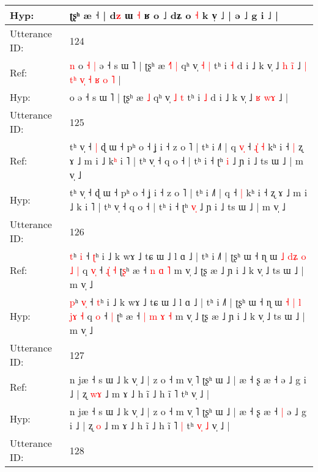 \documentclass[10pt]{article}
\DeclareRobustCommand{\hl}[1]{{\textcolor{red}{#1}}}
\begin{document}
\begin{longtable}{ll}
Hyp: & ʈʂʰ æ ˧\hl{} | d\hl{z} ɯ \hl{˧} ʁ o ˩ dʑ o \hl{˧} k v̩\hl{}\hl{}\hl{}\hl{}\hl{}\hl{} ˩ | ə ˩ g i ˩ |
 \\
\midrule
Utterance ID: & 124 \\
Ref: & \hl{n}\hl{ }o\hl{ }\hl{˧}\hl{ }\hl{|} ə ˧ s ɯ ˥ | ʈʂʰ æ\hl{ }\hl{˧}\hl{˥} \hl{|} qʰ v̩ \hl{˧} \hl{|} tʰ i \hl{˧} d i ˩ k v̩ ˩ \hl{h} \hl{i}\hl{̃} ˩\hl{ }\hl{|}\hl{ }\hl{t}\hl{ʰ}\hl{ }\hl{v}\hl{̩}\hl{ }\hl{˧}\hl{ }\hl{ʁ}\hl{ }\hl{o}\hl{ }\hl{˥} |
 \\
Hyp: & \hl{}\hl{}o\hl{}\hl{}\hl{}\hl{} ə ˧ s ɯ ˥ | ʈʂʰ æ\hl{}\hl{}\hl{} \hl{˩} qʰ v̩ \hl{˩} \hl{t} tʰ i \hl{˩} d i ˩ k v̩ ˩ \hl{ʁ} \hl{w}\hl{ɤ} ˩\hl{}\hl{}\hl{}\hl{}\hl{}\hl{}\hl{}\hl{}\hl{}\hl{}\hl{}\hl{}\hl{}\hl{}\hl{}\hl{} |
 \\
\midrule
Utterance ID: & 125 \\
Ref: & tʰ v̩ ˧\hl{ }\hl{|} ɖ ɯ ˧ pʰ o ˧ ʝ i ˧ z o ˥ | tʰ i ˩˥ | q\hl{ }\hl{v}\hl{̩} ˧\hl{ }\hl{ɻ}\hl{̍} \hl{˧} kʰ i ˧\hl{ }\hl{|} ʐ ɤ ˩ m i ˩ k\hl{ʰ} i ˥ | tʰ v̩ ˧ q o ˧ | tʰ i ˧ ʈʰ \hl{}\hl{i} ˩ ɲ i ˩ ts ɯ ˩ | m v̩ ˩
 \\
Hyp: & tʰ v̩ ˧\hl{}\hl{} ɖ ɯ ˧ pʰ o ˧ ʝ i ˧ z o ˥ | tʰ i ˩˥ | q\hl{}\hl{}\hl{} ˧\hl{}\hl{}\hl{} \hl{|} kʰ i ˧\hl{}\hl{} ʐ ɤ ˩ m i ˩ k\hl{} i ˥ | tʰ v̩ ˧ q o ˧ | tʰ i ˧ ʈʰ \hl{v}\hl{̩} ˩ ɲ i ˩ ts ɯ ˩ | m v̩ ˩
 \\
\midrule
Utterance ID: & 126 \\
Ref: & \hl{t}ʰ \hl{}\hl{i} ˧ \hl{ʈ}ʰ i ˩ k wɤ ˩ tɕ ɯ ˩ l ɑ ˩ | tʰ i ˩˥ | ʈʂʰ ɯ ˧ ɳ ɯ \hl{˩} \hl{d}\hl{ʑ} \hl{o} \hl{}\hl{˩} \hl{|} q \hl{v}\hl{̩} ˧\hl{ }\hl{ɻ}\hl{̍} \hl{˧} ʈ\hl{ʂ}ʰ æ ˧\hl{}\hl{} \hl{n} \hl{ɑ} \hl{˥} m v̩ ˩ ʈʂ æ ˩ ɲ i ˩ k v̩ ˩ ts ɯ ˩ | m v̩ ˩
 \\
Hyp: & \hl{p}ʰ \hl{v}\hl{̩} ˧ \hl{t}ʰ i ˩ k wɤ ˩ tɕ ɯ ˩ l ɑ ˩ | tʰ i ˩˥ | ʈʂʰ ɯ ˧ ɳ ɯ \hl{˧} \hl{}\hl{|} \hl{l} \hl{j}\hl{ɤ} \hl{˧} q \hl{}\hl{o} ˧\hl{}\hl{}\hl{} \hl{|} ʈ\hl{}ʰ æ ˧\hl{ }\hl{|} \hl{m} \hl{ɤ} \hl{˧} m v̩ ˩ ʈʂ æ ˩ ɲ i ˩ k v̩ ˩ ts ɯ ˩ | m v̩ ˩
 \\
\midrule
Utterance ID: & 127 \\
Ref: & n jæ ˧ s ɯ ˩ k v̩ ˩ | z o ˧ m v̩ ˥ ʈʂʰ ɯ ˩ | æ ˧ ʂ æ ˧\hl{}\hl{} ə ˩ g i ˩ | ʐ \hl{w}\hl{ɤ} ˩ m ɤ ˩ h ĩ ˩ h ĩ ˥\hl{}\hl{} tʰ\hl{}\hl{}\hl{}\hl{}\hl{} v̩ ˩ |
 \\
Hyp: & n jæ ˧ s ɯ ˩ k v̩ ˩ | z o ˧ m v̩ ˥ ʈʂʰ ɯ ˩ | æ ˧ ʂ æ ˧\hl{ }\hl{|} ə ˩ g i ˩ | ʐ \hl{}\hl{o} ˩ m ɤ ˩ h ĩ ˩ h ĩ ˥\hl{ }\hl{|} tʰ\hl{ }\hl{v}\hl{̩}\hl{ }\hl{˩} v̩ ˩ |
 \\
\midrule
Utterance ID: & 128 \\

\end{longtable}
\end{document}
